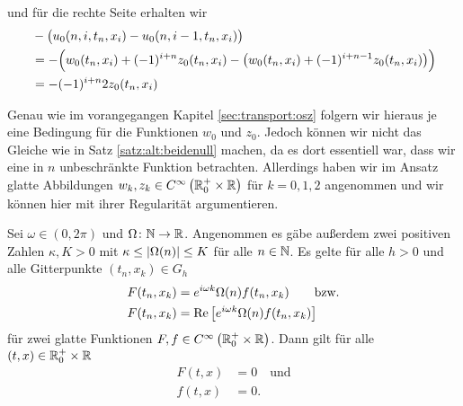 und für die rechte Seite erhalten wir
\begin{align}\label{eq:appendix:kleineta:oh:rechteseite}
&- \bigl( u_0(n, i, t_n, x_i) - u_0(n, i-1, t_n, x_i) \bigr)\\
&= -\Bigl( w_0(t_n, x_i) + (-1)^{i+n} z_0(t_n, x_i) - \bigl( w_0(t_n, x_i) + (-1)^{i+n-1} z_0(t_n, x_i) \bigr) \Bigr) \nonumber\\
&= - (-1)^{i+n} 2 z_0(t_n,x_i) 
\end{align}

Genau wie im vorangegangen Kapitel \ref{sec:transport:osz} folgern wir hieraus je eine Bedingung für die Funktionen $w_0$ und $z_0$.
Jedoch können wir nicht das Gleiche wie in Satz \ref{satz:alt:beidenull} machen, da es dort essentiell war, dass wir eine in $n$ unbeschränkte Funktion betrachten.
Allerdings haben wir im Ansatz glatte Abbildungen $w_k, z_k \in C^{\infty}\left( \mathbb R^+_0 \times \mathbb R \right)$ für $k = 0,1,2$ angenommen und wir können hier mit ihrer Regularität argumentieren.
\begin{satz}\label{satz:glgregulaer}
Sei $\omega \in (0, 2\pi)$ und $\Omega\colon \mathbb N \to \mathbb R$.
Angenommen es gäbe außerdem zwei positiven Zahlen $\kappa, K > 0$ mit $\kappa \leq \left| \Omega(n) \right| \leq K$ für alle $n \in \mathbb N$.
Es gelte für alle $h > 0$ und alle Gitterpunkte $(t_n, x_k) \in G_h$
\begin{align}\label{satz:glgreg:vor}
\begin{split}
F(t_n, x_k) &= e^{i \omega k} \Omega(n) f(t_n, x_k) \qquad \text{bzw.}\\
F(t_n, x_k) &= \operatorname{Re}\left[ e^{i \omega k} \Omega(n) f(t_n, x_k) \right]
\end{split}
\end{align}
für zwei glatte Funktionen $F,f \in C^{\infty}\left( \mathbb R^+_0 \times \mathbb R \right)$. Dann gilt für alle $(t,x) \in \mathbb R^+_0 \times \mathbb R$
\begin{align*}
F(t, x) &= 0 \quad \text{und}\\
f(t, x) &= 0.
\end{align*}
\end{satz}

